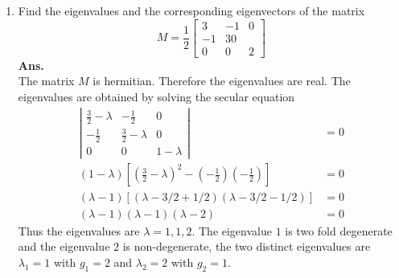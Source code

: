 \begin{enumerate}
	\item	Find the eigenvalues and the corresponding eigenvectors of the matrix
	\begin{equation}
	M = \frac{1}{2}\left[
	\begin{matrix}
	3 & -1 & 0 \\
	-1 & 3 0 \\
	0 & 0 & 2
	\end{matrix}
	\right]
	\end{equation}
	\textbf{Ans.}\\
	The matrix $M$ is hermitian. Therefore the eigenvalues are real. The eigenvalues are obtained by solving the secular equation
	\begin{align*}
		\left|\begin{matrix}
		\frac{3}{2} - \lambda & -\frac{1}{2} & 0 \\
		-\frac{1}{2} & \frac{3}{2} -\lambda & 0 \\
		0 & 0 & 1-\lambda
		\end{matrix}\right| &= 0 \\
		(1-\lambda)\left[(\frac{3}{2}-\lambda)^2 - (-\frac{1}{2})(-\frac{1}{2})\right] &= 0 \\
		(\lambda-1)\left[(\lambda-3/2+1/2)(\lambda-3/2-1/2)\right] &= 0\\
		(\lambda-1)(\lambda-1)(\lambda-2) &= 0
	\end{align*}
	Thus the eigenvalues are $\lambda = 1,1,2$. The eigenvalue $1$ is two fold degenerate and the eigenvalue $2$ is non-degenerate, the two distinct eigenvalues are $\lambda_1=1$ with $g_1=2$ and $\lambda_2=2$ with $g_2=1$.
	

\end{enumerate}
